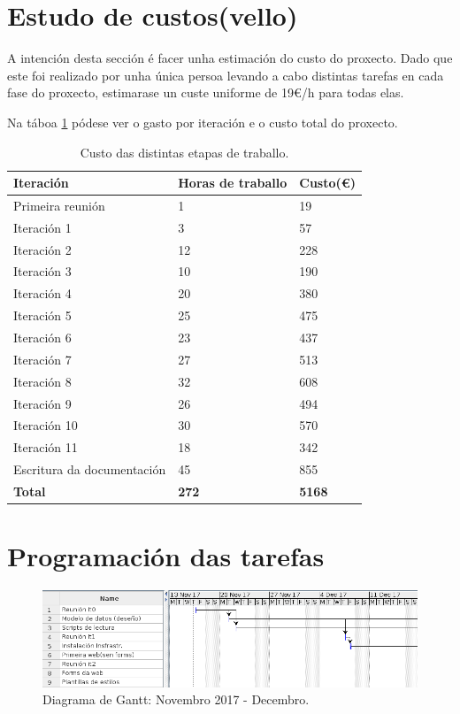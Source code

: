 \section{Estudo de custos(vello)}

A intención desta sección é facer unha estimación do custo do proxecto. Dado que este foi realizado por unha única persoa levando a cabo distintas tarefas en cada fase do proxecto, estimarase un custe uniforme de 19€/h para todas elas. 

Na táboa \ref{tab:custo} pódese ver o gasto por iteración e o custo total do proxecto.

\begin{table}[h]
	\centering
	\begin{tabular}{|p{5cm}|l|l|}
		\hline
		\rowcolor{blue!10}
		Iteración & Horas de traballo & Custo(€)\\
		\hline
		Primeira reunión & 1 &  19\\
		\hline
		Iteración 1 & 3 &  57\\
		\hline
		Iteración 2 & 12 &  228\\
		\hline
		Iteración 3 & 10 &  190\\
		\hline
		Iteración 4 & 20 &  380\\
		\hline
		Iteración 5 & 25 &  475\\
		\hline
		Iteración 6 & 23 &  437\\
		\hline
		Iteración 7 & 27 &  513\\
		\hline
		Iteración 8 & 32 &  608\\
		\hline
		Iteración 9 & 26 &  494\\
		\hline
		Iteración 10 & 30 &  570\\
		\hline
		Iteración 11 &  18 &  342\\
		\hline
		Escritura da documentación & 45 & 855\\
		\hline
		\textbf{Total} & \textbf{272} & \textbf{5168} \\
		\hline
	\end{tabular}
	\caption{Custo das distintas etapas de traballo.}
\label{tab:custo}
\end{table}


\section{Programación das tarefas}


\begin{figure}[H]
	\centering
	\includegraphics[scale=0.55,keepaspectratio=true]{./images/gantt/gantt1-1.png}
	\caption{Diagrama de Gantt: Novembro 2017 - Decembro.}
	\label{fig:gantt1-1}
\end{figure}

